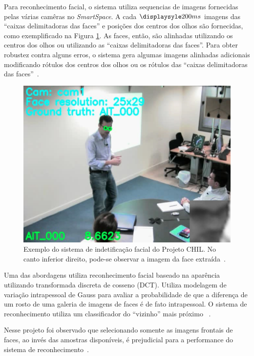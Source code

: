 Para reconhecimento facial, o sistema utiliza sequencias de imagens fornecidas pelas várias camêras no \textit{SmartSpace}. A cada $\displaysyle 200ms$ imagens das ``caixas delimitadoras das faces'' e posições dos centros dos olhos são fornecidas, como exemplificado na Figura \ref{chil}. As faces, então, são alinhadas utilizando os centros dos olhos ou utilizando as ``caixas delimitadoras das faces''. Para obter robustez contra alguns erros, o sistema gera algumas imagens alinhadas adicionais modificando rótulos dos centros dos olhos ou os rótulos das ``caixas delimitadoras das faces''~\cite{chil}.

	\begin{figure}[hbt]
		\begin{center}
			\includegraphics[scale=0.4]{figuras/3.TrabalhosCorrelatos/chil.png}
		\end{center}
		\caption{Exemplo do sistema de indetificação facial do Projeto CHIL. No canto inferior direito, pode-se observar a imagem da face extraída~\cite{chil}.}
		\label{chil}
	\end{figure}

Uma das abordagens utiliza reconhecimento facial baseado na aparência utilizando transformada discreta de cosseno (DCT). Utiliza modelagem de variação intrapessoal de Gauss para avaliar a probabilidade de que a diferença de um rosto de uma galeria de imagens de faces é de fato intrapessoal. O sistema de reconhecimento utiliza um classificador do ``vizinho'' mais próximo ~\cite{chil}.

Nesse projeto foi observado que selecionando somente as imagens frontais de faces, ao invés das amostras disponíveis, é prejudicial para a performance do sistema de reconhecimento~\cite{chil}.

